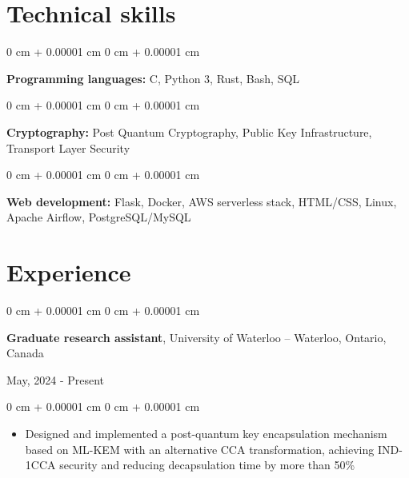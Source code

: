 \documentclass[10pt, letterpaper]{article}
\newenvironment{highlights}{
    \begin{itemize}[
        topsep=0.10 cm,
        parsep=0.10 cm,
        partopsep=0pt,
        itemsep=0pt,
        leftmargin=0 cm + 10pt
    ]
}{
    \end{itemize}
} %
\newenvironment{onecolentry}{
    \begin{adjustwidth}{
        0 cm + 0.00001 cm
    }{
        0 cm + 0.00001 cm
    }
}{
    \end{adjustwidth}
} %
\newenvironment{twocolentry}[2][]{
    \onecolentry
    \def\secondColumn{#2}
    \setcolumnwidth{\fill, 4.5 cm}
    \begin{paracol}{2}
}{
    \switchcolumn \raggedleft \secondColumn
    \end{paracol}
    \endonecolentry
} %
\begin{document}
    \section{Technical skills}
        \begin{onecolentry}
            \textbf{Programming languages:} C, Python 3, Rust, Bash, SQL
        \end{onecolentry}
        \vspace{0.2 cm}
        \begin{onecolentry}
            \textbf{Cryptography:} Post Quantum Cryptography, Public Key Infrastructure, Transport Layer Security
        \end{onecolentry}
        \vspace{0.2 cm}
        \begin{onecolentry}
            \textbf{Web development:} Flask, Docker, AWS serverless stack, HTML/CSS, Linux, Apache Airflow, PostgreSQL/MySQL
        \end{onecolentry}

    \section{Experience}
        \begin{twocolentry}{
            May, 2024 - Present
        }
            \textbf{Graduate research assistant}, University of Waterloo -- Waterloo, Ontario, Canada
        \end{twocolentry}
        \vspace{0.10 cm}
        \begin{onecolentry}
            \begin{highlights}
                \item Designed and implemented a post-quantum key encapsulation mechanism based on ML-KEM with an alternative CCA transformation, achieving IND-1CCA security and reducing decapsulation time by more than 50\%
            \end{highlights}
        \end{onecolentry}
        \vspace{0.2 cm}
\end{document}
